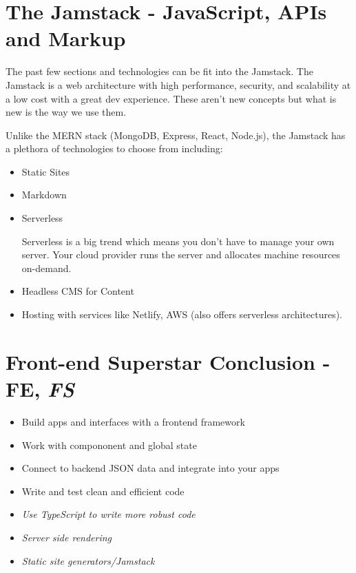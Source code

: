\section{The Jamstack - JavaScript, APIs and Markup}
The past few sections and technologies can be fit into the Jamstack. The Jamstack is a web architecture with high performance, security, and scalability at a low cost with a great dev experience. These aren't new concepts but what is new is the way we use them. 

Unlike the MERN stack (MongoDB, Express, React, Node.js), the Jamstack has a plethora of technologies to choose from including:

\begin{itemize}
    \item Static Sites
    \item Markdown
    \item Serverless
    
    Serverless is a big trend which means you don't have to manage your own server. Your cloud provider runs the server and allocates machine resources on-demand. 
    \item Headless CMS for Content
    \item Hosting with services like Netlify, AWS (also offers serverless architectures).
\end{itemize}

\section{Front-end Superstar Conclusion - FE, \emph{FS}}
\begin{itemize}
    \item Build apps and interfaces with a frontend framework
    \item Work with compononent and global state
    \item Connect to backend JSON data and integrate into your apps
    \item Write and test clean and efficient code
    \item \emph{Use TypeScript to write more robust code}
    \item \emph{Server side rendering}
    \item \emph{Static site generators/Jamstack}
\end{itemize}
